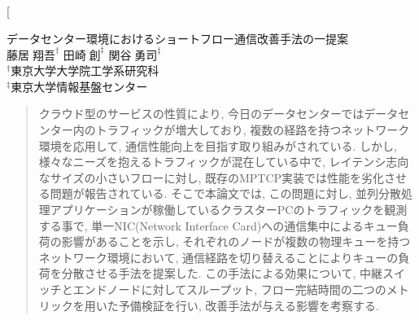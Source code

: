\documentclass[11pt, a4paper, twocolumn]{jsarticle}
\begin{document}

\twocolumn[
\vspace{1.5cm}
\begin{center}
{\Large データセンター環境におけるショートフロー通信改善手法の一提案}\\
\vspace{1em}
{\large $藤居\;翔吾^{\dagger}$ \hspace{1.0cm}$田崎\;創^{\ddagger}$ \hspace{1.0cm}
$関谷\;勇司^{\ddagger}$}\\
${}^{\dagger}$東京大学大学院工学系研究科\\
${}^{\ddagger}$東京大学情報基盤センター \\
\end{center}
\begin{quotation}
\begin{spacing}{0.6}
{\footnotesize クラウド型のサービスの性質により, 今日のデータセンターではデータセンター内のトラフィックが増大しており,
複数の経路を持つネットワーク環境を応用して, 通信性能向上を目指す取り組みがされている.
しかし, 様々なニーズを抱えるトラフィックが混在している中で, レイテンシ志向なサイズの小さいフローに対し,
既存のMPTCP実装では性能を劣化させる問題が報告されている.
そこで本論文では, この問題に対し, 並列分散処理アプリケーションが稼働しているクラスターPCのトラフィックを観測する事で, 単一NIC(Network
Interface Card)への通信集中によるキュー負荷の影響があることを示し,
それぞれのノードが複数の物理キューを持つネットワーク環境において,
通信経路を切り替えることによりキューの負荷を分散させる手法を提案した.
この手法による効果について, 中継スイッチとエンドノードに対してスループット, フロー完結時間の二つのメトリックを用いた予備検証を行い,
改善手法が与える影響を考察する.
}
\end{spacing}
\end{quotation}
\end{document}
